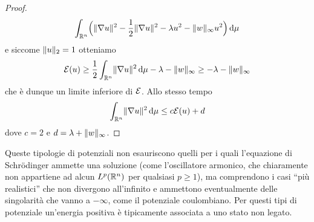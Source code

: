 \begin{proof}
\begin{equation}
\begin{split}
            \int_{\R^n}\Bigl(\norm{\grad u}^2-\frac12\norm{\grad u}^2-\lambda u^2-\norm{w}_\infty u^2\Bigr)\,\dd\mu
        \end{split}
    \end{equation}
    e siccome $\norm{u}_2=1$ otteniamo
    \begin{equation}
        \E(u)\ge
        \frac12\int_{\R^n}\norm{\grad u}^2\,\dd\mu-\lambda-\norm{w}_\infty\ge
        -\lambda-\norm{w}_\infty
    \end{equation}
    che è dunque un limite inferiore di $\E$.
    Allo stesso tempo
    \begin{equation}
        \int_{\R^n}\norm{\grad u}^2\,\dd\mu\le
        c\E(u)+d
    \end{equation}
    dove $c=2$ e $d=\lambda+\norm{w}_\infty$.
\end{proof}
\begin{osservazione} \label{o:potenziali-ammissibili}
    Queste tipologie di potenziali non esauriscono quelli per i quali l'equazione di Schrödinger ammette una soluzione (come l'oscillatore armonico, che chiaramente non appartiene ad alcun $\leb[p]{\R^n}$ per qualsiasi $p\ge 1$), ma comprendono i casi ``più realistici'' che non divergono all'infinito e ammettono eventualmente delle singolarità che vanno a $-\infty$, come il potenziale coulombiano.
    Per questi tipi di potenziale un'energia positiva è tipicamente associata a uno stato non legato.
\end{osservazione}
